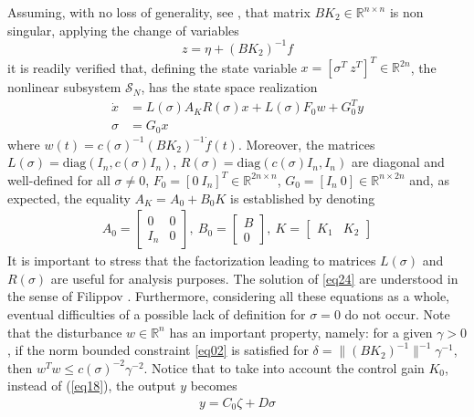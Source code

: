 \documentclass[twocolumn]{autarc_LH}
\newcommand{\Rf}{{\mathbb R}}
\begin{document}
Assuming, with no loss of generality, see \cite{gero:2023}, that matrix $BK_2 \in \Rf^{n \times n}$ is non singular, applying the change of variables 
\begin{equation} \label{eq23}
z = \eta +  (B K_2)^{-1} f
\end{equation}
it is readily verified that, defining the state variable $x =[\sigma^T~z^T]^T \in \Rf^{2n}$, the nonlinear subsystem $\mathcal{S}_{N}$, has the state space realization
\begin{align}
\label{eq24}  \dot x & =  L(\sigma) A_K R(\sigma) x + L(\sigma) F_0 w + G_0^T y  \\
\label{eq25} \sigma & = G_0x
\end{align}
where $w(t) = c(\sigma)^{-1} (BK_2)^{-1} \dot f(t)$. Moreover, the matrices $L(\sigma) = {\textrm{diag} }(I_n,c(\sigma)I_n )$, $R(\sigma) = {\textrm{diag}}(c(\sigma) I_n,I_n)$ are diagonal and well-defined for all $\sigma \neq 0$, $F_0 = [0~I_n]^T \in \Rf^{2n \times n}$, $G_0 = [I_n~0] \in \Rf^{n \times 2n}$ and, as expected, the equality $A_K =A_0 + B_0 K$ is established by denoting
\begin{align}
	\label{eq26}  A_0 \!=\! \left [ \begin{array}{cc} 0 & 0 \\ I_n & 0 \end{array} \right ],~B_0 \!=\! \left [ \begin{array}{c} B \\ 0  \end{array} \right ],~K \!=\! \left [ \begin{array}{cc} K_1 & K_2 \end{array} \right ]
\end{align}
It is important to stress that the factorization leading to matrices $L(\sigma)$ and $R(\sigma)$ are useful for analysis purposes. The solution of \eqref{eq24}
are understood in the sense of Filippov \cite{F:88}. Furthermore, considering all these equations as a whole, eventual difficulties of a possible lack of definition for $\sigma = 0$ do not occur. Note that the disturbance $w \in \Rf^n$  has an important property, namely: for a given $\gamma>0$, if the norm bounded constraint \eqref{eq02} is satisfied for $\delta = \|(BK_2)^{-1}\|^{-1} \gamma^{-1}$, then $w^Tw \leq  c(\sigma)^{-2} \gamma^{-2}$. Notice that to take into account the control gain $K_0$, instead of (\ref{eq18}), the output $y$ becomes 
\begin{align} \label{eqynew}
y = C_{0}\zeta + D \sigma
\end{align}
\end{document}

